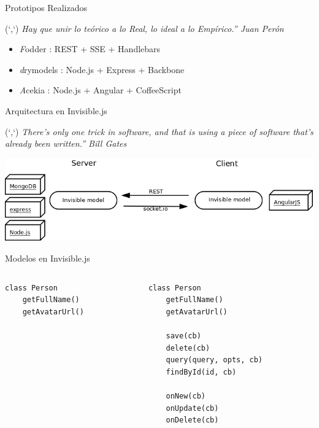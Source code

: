 \documentclass[xcolor=dvipsnames, 14pt]{beamer}
\newenvironment{reference}[2]{%
  \begin{textblock*}{\textwidth}(#1,#2)
      \footnotesize\it\bgroup\color{gray!50!black}}{\egroup\end{textblock*}}
\begin{document}
\begin{frame}{Prototipos Realizados}
\begin{reference}{4mm}{85mm}
``Hay que unir lo teórico a lo Real, lo ideal a lo Empírico.'' Juan Perón
\end{reference}

\begin{itemize}
    \item \emph Fodder : REST + SSE + Handlebars
    \item \emph drymodels : Node.js + Express + Backbone
    \item \emph Acekia : Node.js + Angular + CoffeeScript
\end{itemize}
\end{frame}

\begin{frame}{Arquitectura en Invisible.js}
\begin{reference}{4mm}{85mm}
``There's only one trick in software, and that is using a piece of software that's already been written.'' Bill Gates
\end{reference}

\begin{center}
    \includegraphics[width=\textwidth]{img/arq.png}
\end{center}


\end{frame}

\begin{frame}[fragile]{Modelos en Invisible.js}

\begin{columns}[t]

\begin{column}{0.5\textwidth}
\begin{lstlisting}
class Person
    getFullName()
    getAvatarUrl()
\end{lstlisting}
\end{column}

\begin{column}{0.5\textwidth}
\begin{lstlisting}
class Person
    getFullName()
    getAvatarUrl()

    save(cb)
    delete(cb)
    query(query, opts, cb)
    findById(id, cb)

    onNew(cb)
    onUpdate(cb)
    onDelete(cb)
\end{lstlisting}
\end{column}
\end{columns}
\end{frame}
\end{document}
